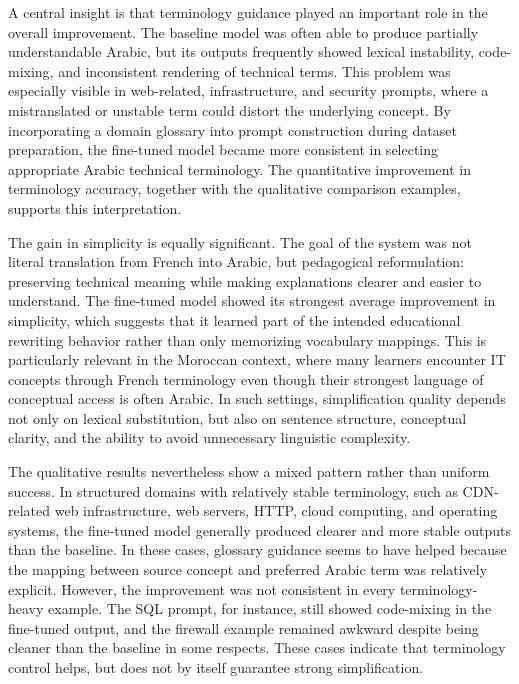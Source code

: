 \documentclass[education,article,submit,moreauthors]{Definitions/mdpi}
\begin{document}
A central insight is that terminology guidance played an important role in the overall improvement. The baseline model was often able to produce partially understandable Arabic, but its outputs frequently showed lexical instability, code-mixing, and inconsistent rendering of technical terms. This problem was especially visible in web-related, infrastructure, and security prompts, where a mistranslated or unstable term could distort the underlying concept. By incorporating a domain glossary into prompt construction during dataset preparation, the fine-tuned model became more consistent in selecting appropriate Arabic technical terminology. The quantitative improvement in terminology accuracy, together with the qualitative comparison examples, supports this interpretation.

The gain in simplicity is equally significant. The goal of the system was not literal translation from French into Arabic, but pedagogical reformulation: preserving technical meaning while making explanations clearer and easier to understand. The fine-tuned model showed its strongest average improvement in simplicity, which suggests that it learned part of the intended educational rewriting behavior rather than only memorizing vocabulary mappings. This is particularly relevant in the Moroccan context, where many learners encounter IT concepts through French terminology even though their strongest language of conceptual access is often Arabic. In such settings, simplification quality depends not only on lexical substitution, but also on sentence structure, conceptual clarity, and the ability to avoid unnecessary linguistic complexity.

The qualitative results nevertheless show a mixed pattern rather than uniform success. In structured domains with relatively stable terminology, such as CDN-related web infrastructure, web servers, HTTP, cloud computing, and operating systems, the fine-tuned model generally produced clearer and more stable outputs than the baseline. In these cases, glossary guidance seems to have helped because the mapping between source concept and preferred Arabic term was relatively explicit. However, the improvement was not consistent in every terminology-heavy example. The SQL prompt, for instance, still showed code-mixing in the fine-tuned output, and the firewall example remained awkward despite being cleaner than the baseline in some respects. These cases indicate that terminology control helps, but does not by itself guarantee strong simplification.
\end{document}
